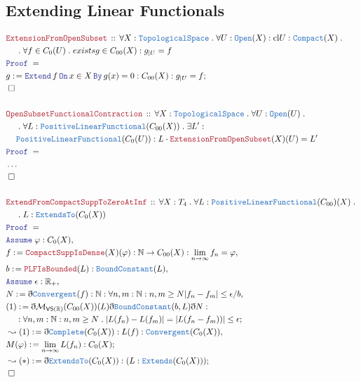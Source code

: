 \documentclass[12pt]{scrartcl}
\newcommand{\TYPE}[1]{\textcolor{NavyBlue}{\mathtt{#1}}}
\newcommand{\LOGIC}[1]{\textcolor{Blue}{\mathtt{#1}}}
\newcommand{\THM}[1]{\textcolor{Maroon}{\mathtt{#1}}}
\renewcommand{\.}{\; . \;}
\newcommand{\de}{: \kern 0.1pc =}
\newcommand{\Theorem}[2]{& \THM{#1} \, :: \, #2 \\ & \Proof = \\ }
\newcommand{\NewLine}{\\ & \kern 1pc}
\newcommand{\Reals}{\mathbb{R} }
\newcommand{\Nat}{\mathbb{N} }
\newcommand{\Say}[3]{& #1 \de #2 : #3, \\}
\newcommand{\Conclude}[3]{& #1 \de #2 : #3; \\}
\newcommand{\Derive}[3]{& \leadsto #1 \de #2 : #3, \\}
\newcommand{\DeriveConclude}[3]{& \leadsto #1 \de #2 : #3 ; \\}
\newcommand{\A}{\LOGIC{Assume} \;}
\newcommand{\Assume}[2]{& \A #1 : #2, \\}
\newcommand{\QED}{\; \square}
\newcommand{\EndProof}{& \QED \\}
\newcommand{\ByDef}{\eth}
\newcommand{\Proof}{\LOGIC{Proof} \; }
\newcommand{\Mor}{\mathcal{M}}
\newcommand{\TS}{\TYPE{TopologicalSpace}}
\newcommand{\Compact}{\TYPE{Compact}}
\newcommand{\PLF}{\TYPE{PositiveLinearFunctional}}
\begin{document}
\subsection{Extending Linear Functionals}
\begin{align*}
\Theorem{ExtensionFromOpenSubset }{ \forall X : \TS \. \forall U : \TYPE{Open}(X) : \mathrm{cl} U :  \Compact(X)   \.   \NewLine \.
\forall f \in C_0(U) \. exists g \in C_{00}(X) : g_{|U} = f }
\Conclude{g}{ \LOGIC{Extend} \, f  \, \LOGIC{On} \, x \in X \, \LOGIC{By} \, g(x) = 0  }{ C_{00}(X) : g_{|U} = f } 
\EndProof
\\
\Theorem{ OpenSubsetFunctionalContraction   }{ \forall X : \TS \. \forall U : \TYPE{Open}(U) \. 
 \NewLine \.  \forall L : \PLF( C_{00}(X)  ) \. 
 \exists L' : \NewLine \PLF( C_{0}(U) ) : L \cdot \THM{ExtensionFromOpenSubset}(X)(U) = L'  }
 & \ldots \\
 \EndProof 
\\
\Theorem{ ExtendFromCompactSuppToZeroAtInf  }{\forall X : T_4 \.  \forall L : \PLF( C_{00})(X) \. \NewLine \.  L : \TYPE{ExtendsTo}(C_{0}(X))    } 
\Assume{\varphi}{C_{0}(X)}
\Say{f}{ \THM{CompactSuppIsDense}(X)(\varphi) }{  \Nat \to C_{00}(X) : \lim_{n \to \infty} f_n = \varphi      }
\Say{b}{ \THM{PLFIsBounded}(L)}{ \TYPE{BoundConstant}(L)  }
\Assume{\epsilon}{\Reals_+}
\Say{N}{ \ByDef\TYPE{Convergent}(f)}{\Nat : \forall n,m : \Nat: n,m  \ge N  |f_n - f_m| \le \epsilon/ b }
\Conclude{(1)}{ \ByDef \Mor_{\mathsf{VS}(\Reals)}( C_{00}(X))(L)\ByDef \TYPE{BoundConstant}(b,L) \ByDef N }{ 
\NewLine
: \forall  n,m : \Nat :n, m \ge N \.  |L(f_n) - L(f_m)| = | L(f_n - f_m))| \le \epsilon   }
\Derive{ (1) }{ \ByDef\TYPE{Complete}(C_0(X))  }{ L(f) : \TYPE{Convergent}(C_0(X)) }
\Conclude{M(\varphi)}{\lim_{n \to \infty} L(f_n) }{ C_0(X)  }
\DeriveConclude{(*)}{ \ByDef \TYPE{ExtendsTo}(C_{0}(X)) }{ (L : \TYPE{Extends}(C_{0}(X))) }
\EndProof
\end{align*}
\newpage
\end{document}
